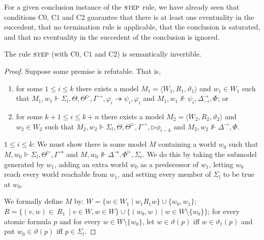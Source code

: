 \documentclass[envcountsect,envcountsame]{llncs}
\newcommand{\condzero}{\mathrm{C0}}
\newcommand{\condone}{\mathrm{C1}}
\newcommand{\condtwo}{\mathrm{C2}}
\newcommand{\forces}{\Vdash}
\newcommand{\iimp}{\twoheadrightarrow}
\newcommand{\limp}{\rightarrow}
\newcommand{\nxt}{\rhd}
\newcommand{\opset}[2]{{#2}^{#1}}
\newcommand{\opsetmi}[3]{\opset{#1}{#2}_{-#3}}
\newcommand{\rel}{R}
\newcommand{\steprulename}{\textsc{step}}
\begin{document}
For a given conclusion instance of the $\steprulename$ rule, we have
already seen that conditions $\condzero$, $\condone$ and $\condtwo$
guarantee that there is at least one eventuality in the succedent, that
no termination rule is applicable, that the conclusion is
saturated, and that no eventuality in the succedent of the conclusion
is ignored.

\begin{lemma}\label{lemma-invertibility-steprule}
  The rule
  $\steprulename$ (with $\condzero$, $\condone$ and $\condtwo$)
  is semantically invertible.
\end{lemma}

\begin{proof}
  Suppose some premise is refutable. That is,
  \begin{enumerate}
  \item 
  for some
  $1 \leq i \leq k$
  there exists a model
  $M_1 = 
    \langle 
     W_1,
     \rel_1,
     \vartheta_1
    \rangle$
and
  $w_1 \in W_1$
  such that
  $M_1, w_1
   \forces 
   \Sigma_l,
   \Theta,
   \opset{\nxt}{\Theta},
   \opset{\limp}{\Gamma},
   \varphi_i \iimp \psi_i,
   \varphi_i    
  $
  and
  $M_1, w_1
  \not\forces 
   \psi_i,
   \opsetmi{\limp}{\Delta}{i},
   \opset{}{\Phi}
  $; or
\item 
  for some
  $k+1 \leq i \leq k+n$
  there exists a model
  $M_2 =
     \langle 
     W_2,
     \rel_2,
     \vartheta_2
    \rangle$
and
  $w_2 \in W_2$
  such that
  $M_2, w_2
   \forces 
   \Sigma_l,
   \Theta,
   \opset{\nxt}{\Theta},
   \opset{\limp}{\Gamma},
   \nxt\phi_{i-k}
  $
 and $M_2, w_2
  \not\forces 
   \opset{\limp}{\Delta},
   \Phi
  $.
  \end{enumerate}

$1\leq i\leq k$:
We must show there is some model
$M$ containing a world $w_0$ such that 
$M, w_0
 \forces
 \Sigma_l,
 \opset{\nxt}{\Theta},
 \opset{\iimp}{\Gamma}
 $
and
$M, w_0
 \not\forces
 \opset{\iimp}{\Delta},
 \opset{\nxt}{\Phi},
 \Sigma_r
 $.
We do this by taking
the submodel generated by $w_1$, 
adding an extra world $w_0$ as a predecessor of
$w_1$, letting $w_0$ reach every world reachable from $w_1$, and 
setting every member of $\Sigma_l$ to be true at $w_0$.


We formally define $M$ by:
   $W = \{w \in W_1 \mid w_1 \rel_1 w\}
        \cup \{w_0 , w_1\}$;
   $R =  \{(v,w) \in ~\rel_1 ~\mid v \in W, w \in W\}  
                  \cup \{(w_0 , w) \mid  w\in W\setminus\{w_0\}\}$;
for every atomic  formula $p$ and
   for every $w \in W\setminus\{w_0\}$, let
   $w\in\vartheta(p)$ iff $w\in\vartheta_1(p)$ and put
   $w_0\in\vartheta(p)$ iff $p \in \Sigma_l$.


\end{proof}
\end{document}

